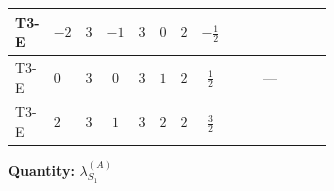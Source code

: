 \documentclass[8pt]{article}
\begin{document}
\begin{landscape}
\begin{longtable}{@{}llcccccc >{\raggedright\arraybackslash}p{0.21\linewidth} >{\raggedright\arraybackslash}p{0.21\linewidth} >{\raggedright\arraybackslash}p{0.21\linewidth}@{}}
\midrule
T3-E & $-2$ & $3$ & $-1$ & $3$ & $0$ & $2$ & $-\frac{1}{2}$ & \scriptsize\adjustbox{max width=\linewidth}{$\begin{gathered} +\frac{3 {g_2}^4}{4}\end{gathered}$} & \scriptsize\adjustbox{max width=\linewidth}{$\begin{gathered} +{g_1}^2 \left(9 {g_2}^2-\frac{3 {\lambda_{S_1}^{(1)}}}{2}-12 {\lambda_{S_1}^{(A)}}\right)\end{gathered}$} & \scriptsize\adjustbox{max width=\linewidth}{$\begin{gathered} +{g_2}^2 (-3 {\lambda_{S_1}^{(1)}}-24 {\lambda_{S_1}^{(A)}})\end{gathered}$} \\
\midrule
T3-E & $0$ & $3$ & $0$ & $3$ & $1$ & $2$ & $\frac{1}{2}$ & \scriptsize\adjustbox{max width=\linewidth}{$\begin{gathered} +\frac{3 {g_2}^4}{4}\end{gathered}$} & --- & \scriptsize\adjustbox{max width=\linewidth}{$\begin{gathered} +{g_2}^2 (-3 {\lambda_{S_1}^{(1)}}-24 {\lambda_{S_1}^{(A)}})\end{gathered}$} \\
\midrule
T3-E & $2$ & $3$ & $1$ & $3$ & $2$ & $2$ & $\frac{3}{2}$ & \scriptsize\adjustbox{max width=\linewidth}{$\begin{gathered} +\frac{3 {g_2}^4}{4}\end{gathered}$} & \scriptsize\adjustbox{max width=\linewidth}{$\begin{gathered} +{g_1}^2 \left(9 {g_2}^2-\frac{3 {\lambda_{S_1}^{(1)}}}{2}-12 {\lambda_{S_1}^{(A)}}\right)\end{gathered}$} & \scriptsize\adjustbox{max width=\linewidth}{$\begin{gathered} +{g_2}^2 (-3 {\lambda_{S_1}^{(1)}}-24 {\lambda_{S_1}^{(A)}})\end{gathered}$} \\
\midrule
\bottomrule
\end{longtable}
\clearpage
\noindent\textbf{Quantity: }$\lambda_{S_1}^{(A)}$\par\smallskip

\end{landscape}
\end{document}

